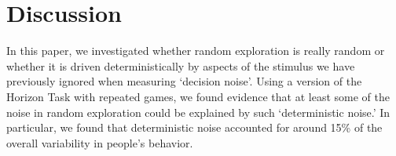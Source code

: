 \documentclass[12pt]{article}
\begin{document}
	
	
	
	
	
	\section*{Discussion}
	
	
	
	 In this paper, we investigated whether random exploration is really random or whether it is driven deterministically by aspects of the stimulus we have previously ignored when measuring `decision noise'.  Using a version of the Horizon Task with repeated games, we found evidence that at least some of the noise in random exploration could be explained by such `deterministic noise.' In particular, we found that deterministic noise accounted for around 15\% of the overall variability in people's behavior. 
	
\end{document}
